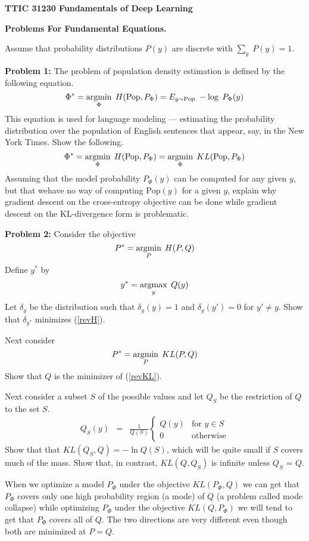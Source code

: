 \documentclass{article}
\begin{document}
\centerline{\bf TTIC 31230 Fundamentals of Deep Learning}
\centerline{\bf Problems For Fundamental Equations.}

\vfill
\vfill
Assume that probability distributions $P(y)$ are discrete with $\sum_y\;P(y) = 1$.

\bigskip
{\bf Problem 1:} The problem of population density estimation is defined by the following equation.
$$\Phi^* = \operatorname*{argmin}_\Phi\;H(\mathrm{Pop},P_\Phi) = E_{y \sim \mathrm{Pop}}\;-\log\;P_\Phi(y)$$
This equation is used for language modeling --- estimating the probability distribution over the population of English sentences that appear, say, in the New York Times.
Show the following.
$$\Phi^* = \operatorname*{argmin}_\Phi\;H(\mathrm{Pop},P_\Phi) = \operatorname*{argmin}_\Phi \;KL(\mathrm{Pop},P_\Phi)$$
Assuming that the model probability $P_\Phi(y)$ can be computed for any given $y$, but that wehave no way of computing $\mathrm{Pop}(y)$ for a given $y$,
explain why gradient descent on the cross-entropy objective
can be done while gradient descent on the KL-divergence form is problematic.


\bigskip
{\bf Problem 2:} Consider the objective
\begin{equation}
  \label{revH}
  P^* = \operatorname*{argmin}_P\;H(P,Q)
\end{equation}
Define $y^*$ by
$$y^* = \operatorname*{argmax}_y\;Q(y)$$
Let $\delta_y$ be the distribution such that $\delta_y(y) = 1$ and $\delta_y(y') = 0$ for $y' \not = y$.
Show that $\delta_{y^*}$ minimizes (\ref{revH}).

Next consider
\begin{equation}
  \label{revKL}
  P^* = \operatorname*{argmin}_P\;KL(P,Q)
\end{equation}
Show that $Q$ is the minimizer of (\ref{revKL}).

Next consider a subset $S$ of the possible values and let $Q_S$ be the restriction of $Q$ to the set $S$.
\begin{eqnarray*}
  Q_S(y) & = & \frac{1}{Q(S)}\left\{\begin{array}{ll} Q(y) & \mbox{for $y \in S$} \\ 0 & \mbox{otherwise} \end{array}\right.
\end{eqnarray*}
Show that that $KL(Q_S,Q) = -\ln Q(S)$, which will be quite small if $S$ covers much of the mass. Show that, in contrast, $KL(Q,Q_S)$ is infinite unless
$Q_S$ = $Q$.

When we optimize a model $P_\Phi$ under the objective $KL(P_\Phi,Q)$ we can get that $P_\Phi$ covers only one high probability region (a mode) of $Q$ (a problem called mode collapse)
while optimizing $P_\Phi$ under the objective $KL(Q,P_\Phi)$ we will tend to get that $P_\Phi$ covers all of $Q$.  The two directions are very different even though both
are minimized at $P = Q$.
\end{document}
